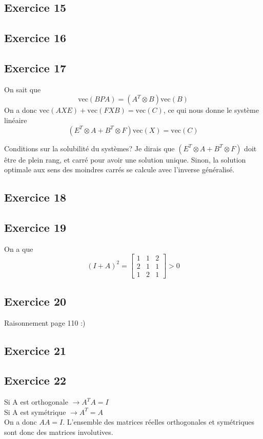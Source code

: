 \subsection*{Exercice 15}
\subsection*{Exercice 16}

\subsection*{Exercice 17}
On sait que
$$ \text{vec}(BPA) = (A^T \otimes B)\text{vec}(B)$$
On a donc $\text{vec}(AXE) + \text{vec}(FXB) = \text{vec}(C)$, ce qui nous donne le système linéaire
$$ (E^T\otimes A + B^T\otimes F )\text{vec}(X)  = \text{vec}(C)$$

Conditions sur la solubilité du systèmes? Je dirais que $ (E^T\otimes A + B^T\otimes F)$ doit être de plein rang, et carré pour avoir une solution unique. Sinon, la solution optimale aux sens des moindres carrés se calcule avec l'inverse généralisé.
\subsection*{Exercice 18}
\subsection*{Exercice 19}
On a que
$$ (I+A)^2 =\begin{bmatrix}
1 & 1 & 2 \\
2 & 1 & 1 \\
1 & 2 & 1
\end{bmatrix} >0$$
\subsection*{Exercice 20}
Raisonnement  page 110 :)
\subsection*{Exercice 21}
\subsection*{Exercice 22}
Si A est orthogonale $\rightarrow A^TA = I$\\

Si A est symétrique $\rightarrow A^T = A$\\

On a donc $AA = I$. L'ensemble des matrices réelles orthogonales et symétriques sont donc des matrices involutives.

